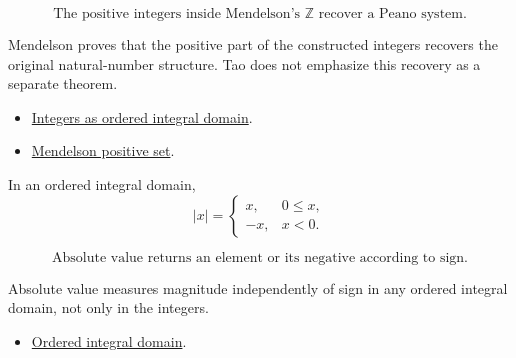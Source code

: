 
\begin{remark*}
\[
  \text{The positive integers inside Mendelson's } \mathbb{Z}
  \text{ recover a Peano system.}
\]
\end{remark*}

\begin{remark*}[Interpretation]
Mendelson proves that the positive part of the constructed integers recovers
the original natural-number structure. Tao does not emphasize this recovery as
a separate theorem.
\end{remark*}

\begin{dependencies}
\begin{itemize}
  \item \hyperref[cor:men-integers-ordered-integral-domain]{Integers as ordered integral domain}.
  \item \hyperref[def:men-positive-set]{Mendelson positive set}.
\end{itemize}
\end{dependencies}

\begin{definition}
\label{def:men-absolute-value}
In an ordered integral domain,
\[
  |x| =
  \begin{cases}
    x, & 0\leq x,\\
    -x, & x<0.
  \end{cases}
\]
\end{definition}

\begin{remark*}
\[
  \text{Absolute value returns an element or its negative according to sign.}
\]
\end{remark*}

\begin{remark*}[Interpretation]
Absolute value measures magnitude independently of sign in any ordered
integral domain, not only in the integers.
\end{remark*}

\begin{dependencies}
\begin{itemize}
  \item \hyperref[def:men-ordered-integral-domain]{Ordered integral domain}.
\end{itemize}
\end{dependencies}


